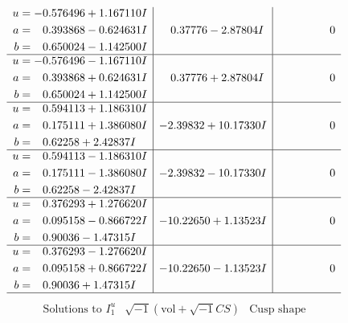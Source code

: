 \documentclass[1p]{elsarticle_modified}
\theoremstyle{definition}
\newcommand{\I}{\sqrt{-1}}
\begin{document}
$$\begin{array}{c|c|c}
\begin{aligned}
u &= -0.576496 + 1.167110 I \\
a &= \phantom{-}0.393868 - 0.624631 I \\
b &= \phantom{-}0.650024 - 1.142500 I\end{aligned}
 & \phantom{-}0.37776 - 2.87804 I & \phantom{-0.000000 } 0 \\ \hline\begin{aligned}
u &= -0.576496 - 1.167110 I \\
a &= \phantom{-}0.393868 + 0.624631 I \\
b &= \phantom{-}0.650024 + 1.142500 I\end{aligned}
 & \phantom{-}0.37776 + 2.87804 I & \phantom{-0.000000 } 0 \\ \hline\begin{aligned}
u &= \phantom{-}0.594113 + 1.186310 I \\
a &= \phantom{-}0.175111 + 1.386080 I \\
b &= \phantom{-}0.62258 + 2.42837 I\end{aligned}
 & -2.39832 + 10.17330 I & \phantom{-0.000000 } 0 \\ \hline\begin{aligned}
u &= \phantom{-}0.594113 - 1.186310 I \\
a &= \phantom{-}0.175111 - 1.386080 I \\
b &= \phantom{-}0.62258 - 2.42837 I\end{aligned}
 & -2.39832 - 10.17330 I & \phantom{-0.000000 } 0 \\ \hline\begin{aligned}
u &= \phantom{-}0.376293 + 1.276620 I \\
a &= \phantom{-}0.095158 - 0.866722 I \\
b &= \phantom{-}0.90036 - 1.47315 I\end{aligned}
 & -10.22650 + 1.13523 I & \phantom{-0.000000 } 0 \\ \hline\begin{aligned}
u &= \phantom{-}0.376293 - 1.276620 I \\
a &= \phantom{-}0.095158 + 0.866722 I \\
b &= \phantom{-}0.90036 + 1.47315 I\end{aligned}
 & -10.22650 - 1.13523 I & \phantom{-0.000000 } 0\\
 \hline 
 \end{array}$$\newpage$$\begin{array}{c|c|c}  
\text{Solutions to }I^u_{1}& \I (\text{vol} + \sqrt{-1}CS) & \text{Cusp shape}\\

\end{array}$$
\end{document}
